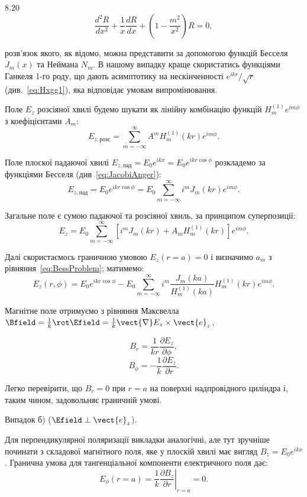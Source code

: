 \begin{Solution}{8.{20}}
\begin{equation}\label{eq:BessProblem}\tag{*}
		\frac{d^2R}{dx^2} + \frac1x\frac{dR}{dx} + \left(1 - \frac{m^2}{x^2} \right) R = 0,
\end{equation}

	розв'язок якого, як відомо, можна представити за допомогою функцій Бесселя $J_m(x)$ та Неймана $N_m$.
    В нашому випадку краще скористатись функціями Ганкеля 1-го роду, що дають асимптотику на нескінченності $e^{ikr}/\sqrt{r}$ (див.~\eqref{eq:Hxgg1}), яка відповідає умовам випромінювання.

    Поле  $E_z$ розсіяної хвилі будемо шукати як  лінійну комбінацію функцій $H_m^{(1)}e^{im\phi}$ з коефіцієнтами $A_m$:
	\[
		E_{z,\text{розс}} =  \sum\limits_{m = -\infty}^{\infty} A^m H^{(1)}_m(k r)e^{im\phi}.
	\]

	Поле плоскої падаючої хвилі $ E_{z,\text{пад}} = E_0e^{ikx} = E_0e^{ikr\cos\phi}$ розкладемо за функціями Бесселя (див~\eqref{eq:JacobiAnger}):
	\[
		E_{z,\text{пад}} =  E_0e^{ikr\cos\phi} =  E_0 \sum\limits_{m = -\infty}^{\infty} i^m J_m(k r)e^{im\phi}.
	\]

	Загальне поле є сумою падаючої та розсіяної хвиль, за принципом суперпозиції:
	\[
		E_z = E_0 \sum\limits_{m = -\infty}^{\infty}[ i^mJ_m(kr) + A_mH^{(1)}_m(kr)]e^{im\phi}.
	\]

	Далі скористаємось граничною умовою $E_z(r = a) = 0$  і визначимо $a_m$ з рівняння~\eqref{eq:BessProblem}; матимемо:
	\[
		E_z(r,\phi) = E_0e^{ikr\cos\phi} - E_0\sum\limits_{m = -\infty}^{\infty} i^m \frac{J_m(ka)}{H_m^{(1)}(ka)}H_m^{(1)}(kr)e^{im\phi}.
	\]

    Магнітне поле отримуємо з рівняння Максвелла $\Bfield = \frac1k\rot\Efield = \frac1k \vect{\nabla}E_z\times \vect{e}_z$,

    \[
        B_r=\frac{1}{kr}\frac{\partial E_z}{\partial \phi},
    \]
    \[
        B_\phi=-\frac{1}{k}\frac{\partial E_z}{\partial r}.
    \]

    Легко  перевірити, що $B_r=0$ при $r=a$ на  поверхні надпровідного циліндра і, таким чином, задовольняє граничній умові.

    Випадок б) ($\Efield \perp \vect{e}_z$).

	Для перпендикулярної поляризації викладки аналогічні, але тут зручніше починати з складової магнітного поля, яке у плоскій хвилі має вигляд $B_z = E_0e^{ikx}$. Гранична умова для тангенціальної компоненти електричного поля дає:
	\[
		E_{\phi}(r = a) = \left. \frac1k\frac{\partial B_z}{\partial r}\right|_{r = a} = 0.
	\]


\end{Solution}
